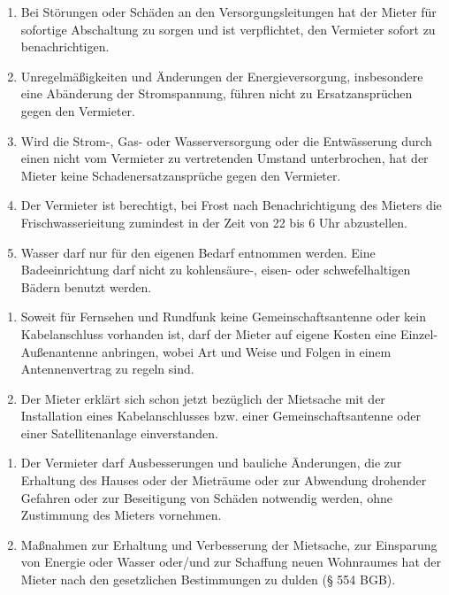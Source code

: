 \documentclass{scrreprt}[12pt,a4paper,twoside,duplex]
\begin{document}
\begin{contract}
\begin{enumerate}
  \item Bei Störungen oder Schäden an den Versorgungsleitungen hat der Mieter
  für sofortige Abschaltung zu sorgen und ist verpflichtet, den Vermieter
  sofort zu benachrichtigen.
  \item Unregelmäßigkeiten und Änderungen der Energieversorgung, insbesondere
  eine Abänderung der Stromspannung, führen nicht zu Ersatzansprüchen gegen den
  Vermieter.
  \item Wird die Strom-, Gas- oder Wasserversorgung oder die Entwässerung durch
  einen nicht vom Vermieter zu vertretenden Umstand unterbrochen, hat der Mieter
  keine Schadenersatzansprüche gegen den Vermieter.
  \item Der Vermieter ist berechtigt, bei Frost nach Benachrichtigung des
  Mieters die Frischwasserieitung zumindest in der Zeit von 22 bis 6 Uhr
  abzustellen.
  \item Wasser darf nur für den eigenen Bedarf entnommen werden. Eine
  Badeeinrichtung darf nicht zu kohlensäure-, eisen- oder schwefelhaltigen
  Bädern benutzt werden.
\end{enumerate}
\end{contract}

\begin{contract}
\begin{enumerate}
  \item Soweit für Fernsehen und Rundfunk keine Ge\-mein\-schafts\-an\-ten\-ne oder kein
  Kabelanschluss vorhanden ist, darf der Mieter auf eigene Kosten eine
  Einzel-Außenantenne anbringen, wobei Art und Weise und Folgen in einem
  Antennenvertrag zu regeln sind.
  \item Der Mieter erklärt sich schon jetzt bezüglich der Mietsache mit der
  Installation eines Kabelanschlusses bzw. einer Ge\-mein\-schafts\-an\-ten\-ne oder einer
  Satellitenanlage einverstanden.
\end{enumerate}
\end{contract}

\begin{contract}
\begin{enumerate}
  \item Der Vermieter darf Ausbesserungen und bauliche Änderungen, die zur
  Erhaltung des Hauses oder der Mieträume oder zur Abwendung drohender Gefahren
  oder zur Beseitigung von Schäden notwendig werden, ohne Zustimmung des Mieters
  vornehmen.
  \item Maßnahmen zur Erhaltung und Verbesserung der Mietsache, zur Einsparung
  von Energie oder Wasser oder/und zur Schaffung neuen Wohnraumes hat der Mieter
  nach den gesetzlichen Bestimmungen zu dulden (§ 554 BGB).
\end{enumerate}
\end{contract}
\end{document}
